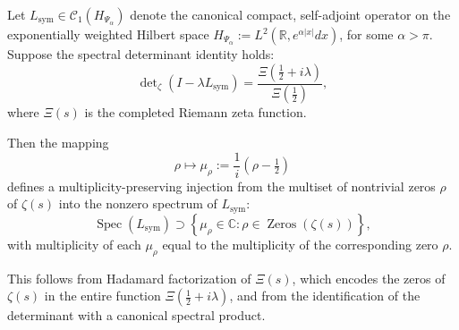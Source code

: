 \begin{lemma}
\label{lem:spectral_encoding_injection}
Let \( L_{\mathrm{sym}} \in \mathcal{C}_1(H_{\Psi_\alpha}) \) denote the canonical compact, self-adjoint operator on the exponentially weighted Hilbert space \( H_{\Psi_\alpha} := L^2(\mathbb{R}, e^{\alpha |x|} dx) \), for some \( \alpha > \pi \). Suppose the spectral determinant identity holds:
\[
\det\nolimits_{\zeta}(I - \lambda L_{\mathrm{sym}}) = \frac{\Xi\left( \tfrac{1}{2} + i\lambda \right)}{\Xi\left( \tfrac{1}{2} \right)},
\]
where \( \Xi(s) \) is the completed Riemann zeta function.

Then the mapping
\[
\rho \mapsto \mu_\rho := \frac{1}{i}(\rho - \tfrac{1}{2})
\]
defines a multiplicity-preserving injection from the multiset of nontrivial zeros \( \rho \) of \( \zeta(s) \) into the nonzero spectrum of \( L_{\mathrm{sym}} \):
\[
\operatorname{Spec}(L_{\mathrm{sym}}) \supset \left\{ \mu_\rho \in \mathbb{C} : \rho \in \operatorname{Zeros}(\zeta(s)) \right\},
\]
with multiplicity of each \( \mu_\rho \) equal to the multiplicity of the corresponding zero \( \rho \).

\medskip
\noindent
This follows from Hadamard factorization of \( \Xi(s) \), which encodes the zeros of \( \zeta(s) \) in the entire function \( \Xi(\tfrac{1}{2} + i\lambda) \), and from the identification of the determinant with a canonical spectral product.
\end{lemma}
